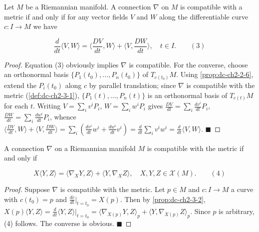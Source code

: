 \begin{proposition}
  \label{prop:dc-ch2-3-2}
  \leanok
  Let $M$ be a Riemannian manifold. A connection $\nabla$ on $M$ is compatible with
  a metric if and only if for any vector fields $V$ and $W$ along the differentiable
  curve $c:I\to M$ we have
  
  $$
  \frac{d}{dt}\langle V,W\rangle=\Big\langle\frac{DV}{dt},W\Big\rangle+\Big\langle V,\frac{DW}{dt}\Big\rangle,\quad t\in I.\qquad(3)
  $$
\end{proposition}
\begin{proof}
  \leanok
  Equation (3) obviously implies $\nabla$ is compatible. For the converse,
  choose an orthonormal basis $\{P_1(t_0),\dots,P_n(t_0)\}$ of $T_{c(t_0)}M$. Using
  \cref{prop:dc-ch2-2-6}, extend the $P_i(t_0)$ along $c$ by parallel translation; since
  $\nabla$ is compatible with the metric (\cref{def:dc-ch2-3-1}), $\{P_1(t),\dots,P_n(t)\}$
  is an orthonormal basis of $T_{c(t)}M$ for each $t$. Writing $V=\sum_i v^i P_i$,
  $W=\sum_i w^i P_i$ gives $\frac{DV}{dt}=\sum_i\frac{dv^i}{dt}P_i$,
  $\frac{DW}{dt}=\sum_i\frac{dw^i}{dt}P_i$, whence
  $\langle\frac{DV}{dt},W\rangle+\langle V,\frac{DW}{dt}\rangle
  =\sum_i(\frac{dv^i}{dt}w^i+\frac{dw^i}{dt}v^i)
  =\frac{d}{dt}\sum_i v^i w^i=\frac{d}{dt}\langle V,W\rangle$. $\blacksquare$
\end{proof}

\begin{corollary}
  \label{cor:dc-ch2-3-3}
  \leanok
  A connection $\nabla$ on a Riemannian manifold $M$ is compatible with the metric
  if and only if
  
  $$
  X\langle Y,Z\rangle=\langle\nabla_X Y,Z\rangle+\langle Y,\nabla_X Z\rangle,\quad X,Y,Z\in\mathcal{X}(M).\qquad(4)
  $$
\end{corollary}
\begin{proof}
  Suppose $\nabla$ is compatible with the metric. Let $p\in M$ and
  $c:I\to M$ a curve with $c(t_0)=p$ and $\frac{dc}{dt}\big|_{t=t_0}=X(p)$. Then by
  \cref{prop:dc-ch2-3-2},
  $X(p)\langle Y,Z\rangle=\frac{d}{dt}\langle Y,Z\rangle\big|_{t=t_0}
  =\langle\nabla_{X(p)}Y,Z\rangle_p+\langle Y,\nabla_{X(p)}Z\rangle_p$. Since $p$ is
  arbitrary, (4) follows. The converse is obvious. $\blacksquare$
\end{proof}

